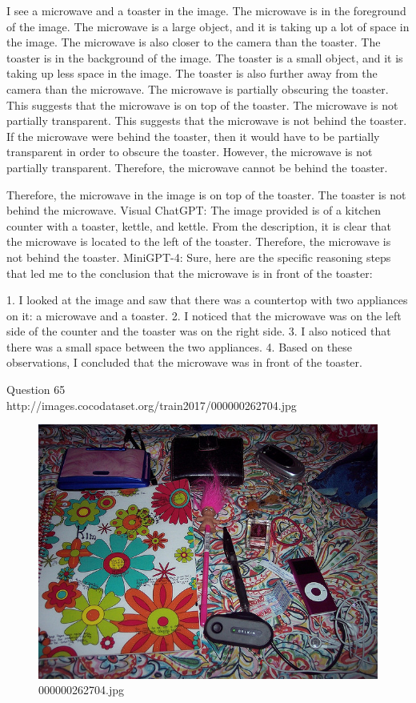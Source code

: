 \begin{enumerate}
    I see a microwave and a toaster in the image.
    The microwave is in the foreground of the image. The microwave is a large object, and it is taking up a lot of space in the image. The microwave is also closer to the camera than the toaster.
    The toaster is in the background of the image. The toaster is a small object, and it is taking up less space in the image. The toaster is also further away from the camera than the microwave.
    The microwave is partially obscuring the toaster. This suggests that the microwave is on top of the toaster.
    The microwave is not partially transparent. This suggests that the microwave is not behind the toaster.
    If the microwave were behind the toaster, then it would have to be partially transparent in order to obscure the toaster. However, the microwave is not partially transparent. Therefore, the microwave cannot be behind the toaster.

    Therefore, the microwave in the image is on top of the toaster. The toaster is not behind the microwave.
    \subitem Visual ChatGPT: 
    The image provided is of a kitchen counter with a toaster, kettle, and kettle. From the description, it is clear that the microwave is located to the left of the toaster. Therefore, the microwave is not behind the toaster.
    \subitem MiniGPT-4: Sure, here are the specific reasoning steps that led me to the conclusion that the microwave is in front of the toaster:

    1. I looked at the image and saw that there was a countertop with two appliances on it: a microwave and a toaster.
    2. I noticed that the microwave was on the left side of the counter and the toaster was on the right side.
    3. I also noticed that there was a small space between the two appliances.
    4. Based on these observations, I concluded that the microwave was in front of the toaster.
\end{enumerate}
Question 65\\
http://images.cocodataset.org/train2017/000000262704.jpg
\begin{figure}[h]
    \centering
    \includegraphics[width=0.8\linewidth]{../image set/hard/000000262704.jpg}
    \caption{000000262704.jpg}
\end{figure}
